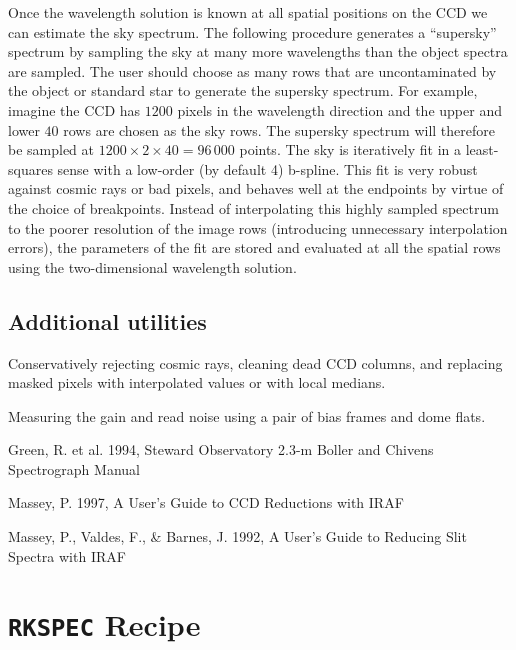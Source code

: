 \documentclass[12pt,preprint]{aastex}
\begin{document}
Once the wavelength solution is known at all spatial positions on the
CCD we can estimate the sky spectrum.  The following procedure
generates a ``supersky'' spectrum by sampling the sky at many more
wavelengths than the object spectra are sampled.  The user should
choose as many rows that are uncontaminated by the object or standard
star to generate the supersky spectrum.  For example, imagine the CCD
has $1200$ pixels in the wavelength direction and the upper and lower
$40$ rows are chosen as the sky rows.  The supersky spectrum will
therefore be sampled at $1200\times2\times40=96\,000$ points.  The sky
is iteratively fit in a least-squares sense with a low-order (by
default 4) b-spline.  This fit is very robust against cosmic rays or
bad pixels, and behaves well at the endpoints by virtue of the choice
of breakpoints.  Instead of interpolating this highly sampled spectrum
to the poorer resolution of the image rows (introducing unnecessary
interpolation errors), the parameters of the fit are stored and
evaluated at all the spatial rows using the two-dimensional wavelength
solution.

\subsection{Additional utilities}

Conservatively rejecting cosmic rays, cleaning dead CCD columns, and
replacing masked pixels with interpolated values or with local
medians.

Measuring the gain and read noise using a pair of bias frames and dome
flats.  

\acknowledgments

\begin{references}{}

 Green, R. et al. 1994, Steward Observatory 2.3-m Boller
and Chivens Spectrograph Manual

 Massey, P. 1997, A User's Guide to CCD Reductions with
IRAF

 Massey, P., Valdes, F., \& Barnes, J. 1992, A User's
Guide to Reducing Slit Spectra with IRAF

\end{references}

\clearpage

\section*{{\tt RKSPEC} Recipe}
\end{document}
